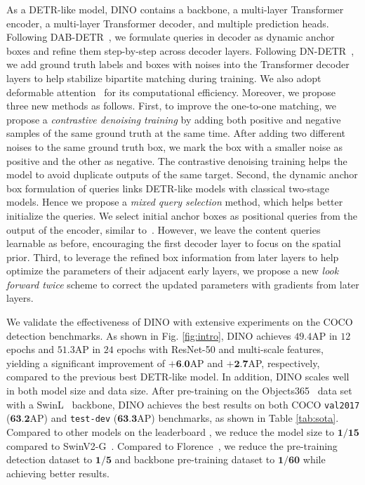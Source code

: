 \documentclass[runningheads]{llncs}
\newcommand{\modelname}{{DINO}}
\begin{document}
As a DETR-like model, {\modelname} contains a backbone, a multi-layer Transformer encoder, a multi-layer Transformer decoder, and multiple prediction heads. Following DAB-DETR~\cite{liu2022dab}, we formulate queries in decoder as dynamic anchor boxes and refine them step-by-step across decoder layers. Following DN-DETR~\cite{li2022dn}, we add ground truth labels and boxes with noises into the Transformer decoder layers to help stabilize bipartite matching during training. We also adopt deformable attention~\cite{zhu2020deformable} for its computational efficiency. Moreover, we propose three new methods as follows. 
First, to improve the one-to-one matching, we propose a \textit{contrastive denoising training} by adding both positive and negative samples of the same ground truth at the same time. After adding two different noises to the same ground truth box, we mark the box with a smaller noise as positive and the other as negative. The contrastive denoising training helps the model to avoid duplicate outputs of the same target. 
Second, the dynamic anchor box formulation of queries links DETR-like models with classical two-stage models. Hence we propose a \textit{mixed query selection} method, which helps better initialize the queries. We select initial anchor boxes as positional queries from the output of the encoder, similar to~\cite{zhu2020deformable,yao2021efficient}. However, we leave the content queries learnable as before, encouraging the first decoder layer to focus on the spatial prior. 
Third, to leverage the refined box information from later layers to help optimize the parameters of their adjacent early layers,
we propose a new \textit{look forward twice} scheme to correct the updated parameters with gradients from later layers.


We validate the effectiveness of DINO with extensive experiments on the COCO~\cite{lin2015microsoft} detection benchmarks. As shown in Fig. \ref{fig:intro}, DINO achieves $49.4$AP in $12$ epochs and $51.3$AP in $24$ epochs with ResNet-50 and multi-scale features, yielding a significant improvement of $\textbf{+6.0}$AP and $\textbf{+2.7}$AP, respectively, compared to the previous best DETR-like model.
In addition, DINO scales well in both model size and data size. After pre-training on the Objects365~\cite{shao2019objects365} data set with a  SwinL~\cite{liu2021swin} backbone, DINO achieves the best results on both COCO \texttt{val2017} ($\textbf{63.2}$AP) and \texttt{test-dev} ($\textbf{63.3}$AP) benchmarks, as shown in Table \ref{tab:sota}.
Compared to other models on the leaderboard \cite{paperwithcode}, we reduce the model size to $\textbf{1/15}$ compared to SwinV2-G~\cite{liu2021swinv2}. Compared to Florence~\cite{yuan2021florence}, we reduce the pre-training detection dataset to $\textbf{1/5}$ and backbone pre-training dataset to $\textbf{1/60}$ while achieving better results.
\end{document}
